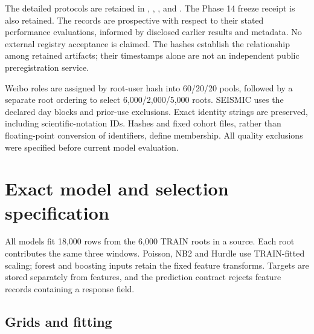 The detailed protocols are retained in , , , and . The Phase 14 freeze receipt is also retained. The records are prospective with respect to their stated performance evaluations, informed by disclosed earlier results and metadata. No external registry acceptance is claimed. The hashes establish the relationship among retained artifacts; their timestamps alone are not an independent public preregistration service.

Weibo roles are assigned by root-user hash into 60/20/20 pools, followed by a separate root ordering to select 6,000/2,000/5,000 roots. SEISMIC uses the declared day blocks and prior-use exclusions. Exact identity strings are preserved, including scientific-notation IDs. Hashes and fixed cohort files, rather than floating-point conversion of identifiers, define membership. All quality exclusions were specified before current model evaluation.

\hypertarget{exact-model-and-selection-specification}{%
\section{Exact model and selection specification}\label{exact-model-and-selection-specification}}

All models fit 18,000 rows from the 6,000 TRAIN roots in a source. Each root contributes the same three windows. Poisson, NB2 and Hurdle use TRAIN-fitted scaling; forest and boosting inputs retain the fixed feature transforms. Targets are stored separately from features, and the prediction contract rejects feature records containing a response field.

\hypertarget{s2.1-grids-and-fitting}{%
\subsection{Grids and fitting}\label{s2.1-grids-and-fitting}}


